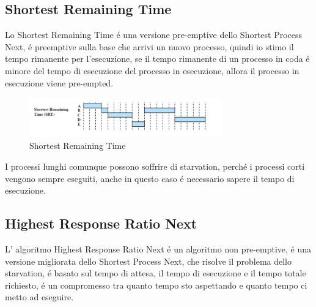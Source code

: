    \subsection{Shortest Remaining Time}
    Lo Shortest Remaining Time é una versione pre-emptive dello Shortest Process Next, é preemptive sulla base che arrivi
    un nuovo processo, quindi io stimo il tempo rimanente per l'esecuzione, se il tempo rimanente di un processo in coda é minore
    del tempo di esecuzione del processo in esecuzione, allora il processo in esecuzione viene pre-empted.
    \begin{figure}[H]
        \centering
        \includegraphics[width=0.75\textwidth]{immagini/SRT}
        \caption{Shortest Remaining Time}
    \end{figure}
    I processi lunghi comunque possono soffrire di starvation, perché i processi corti vengono sempre eseguiti, anche in
    questo caso é necessario sapere il tempo di esecuzione.
    \subsection{Highest Response Ratio Next}
    L' algoritmo Highest Response Ratio Next é un algoritmo non pre-emptive, é una versione migliorata dello Shortest Process Next,
    che risolve il problema dello starvation, é basato sul tempo di attesa, il tempo di esecuzione e il tempo totale richiesto,
    é un compromesso tra quanto tempo sto aspettando e quanto tempo ci metto ad eseguire.

